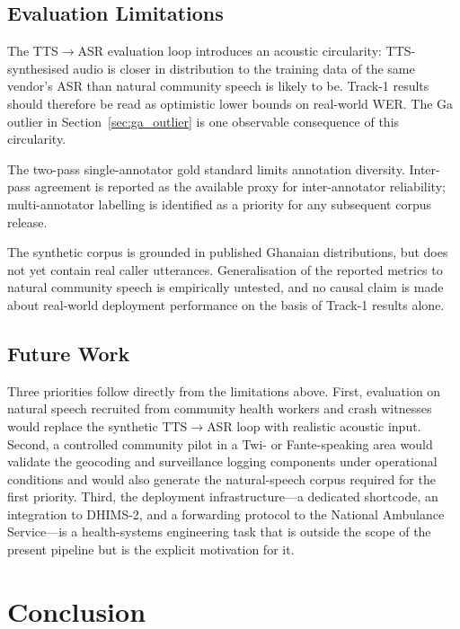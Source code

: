 \documentclass[conference]{IEEEtran}
\begin{document}
\subsection{Evaluation Limitations}
\label{sec:limitations}

The TTS$\rightarrow$ASR evaluation loop introduces an acoustic
circularity: TTS-synthesised audio is closer in distribution to the
training data of the same vendor's ASR than natural community speech
is likely to be. Track-1 results should therefore be read as
optimistic lower bounds on real-world WER. The Ga outlier in
Section~\ref{sec:ga_outlier} is one observable consequence of this
circularity.

The two-pass single-annotator gold standard limits annotation
diversity. Inter-pass agreement is reported as the available proxy
for inter-annotator reliability; multi-annotator labelling is
identified as a priority for any subsequent corpus release.

The synthetic corpus is grounded in published Ghanaian
distributions, but does not yet contain real caller utterances.
Generalisation of the reported metrics to natural community speech
is empirically untested, and no causal claim is made about real-world
deployment performance on the basis of Track-1 results alone.

\subsection{Future Work}

Three priorities follow directly from the limitations above.
First, evaluation on natural speech recruited from community health
workers and crash witnesses would replace the synthetic
TTS$\rightarrow$ASR loop with realistic acoustic input. Second, a
controlled community pilot in a Twi- or Fante-speaking area would
validate the geocoding and surveillance logging components under
operational conditions and would also generate the natural-speech
corpus required for the first priority. Third, the deployment
infrastructure---a dedicated shortcode, an integration to DHIMS-2,
and a forwarding protocol to the National Ambulance Service---is a
health-systems engineering task that is outside the scope of the
present pipeline but is the explicit motivation for it.


\section{Conclusion}
\label{sec:conclusion}
\end{document}
